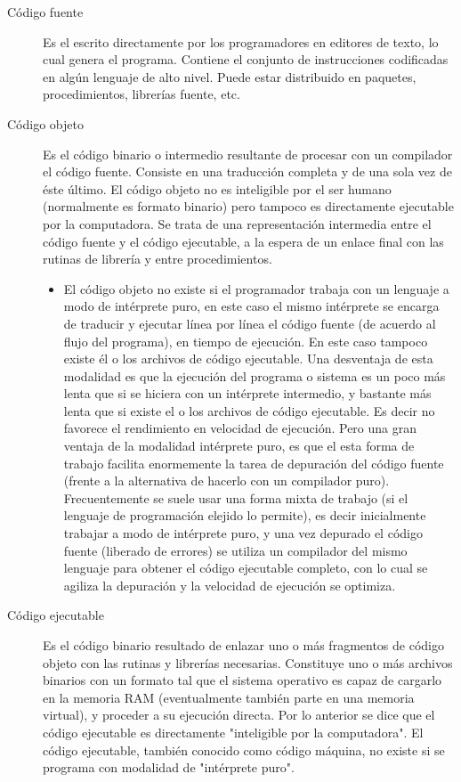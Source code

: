 \documentclass[12pt,legalpaper]{report}
\begin{document}
\begin{description}

    \item[Código fuente] Es el escrito directamente por los programadores en editores de texto, lo cual genera el programa. Contiene el conjunto de instrucciones codificadas en algún lenguaje de alto nivel. Puede estar distribuido en paquetes, procedimientos, librerías fuente, etc.

    \item[Código objeto] Es el código binario o intermedio resultante de procesar con un compilador el código fuente. Consiste en una traducción completa y de una sola vez de éste último. El código objeto no es inteligible por el ser humano (normalmente es formato binario) pero tampoco es directamente ejecutable por la computadora. Se trata de una representación intermedia entre el código fuente y el código ejecutable, a la espera de un enlace final con las rutinas de librería y entre procedimientos.

	\begin{itemize}
		\item El código objeto no existe si el programador trabaja con un lenguaje a modo de intérprete puro, en este caso el mismo intérprete se encarga de traducir y ejecutar línea por línea el código fuente (de acuerdo al flujo del programa), en tiempo de ejecución. En este caso tampoco existe él o los archivos de código ejecutable. Una desventaja de esta modalidad es que la ejecución del programa o sistema es un poco más lenta que si se hiciera con un intérprete intermedio, y bastante más lenta que si existe el o los archivos de código ejecutable. Es decir no favorece el rendimiento en velocidad de ejecución. Pero una gran ventaja de la modalidad intérprete puro, es que el esta forma de trabajo facilita enormemente la tarea de depuración del código fuente (frente a la alternativa de hacerlo con un compilador puro). Frecuentemente se suele usar una forma mixta de trabajo (si el lenguaje de programación elejido lo permite), es decir inicialmente trabajar a modo de intérprete puro, y una vez depurado el código fuente (liberado de errores) se utiliza un compilador del mismo lenguaje para obtener el código ejecutable completo, con lo cual se agiliza la depuración y la velocidad de ejecución se optimiza.
	\end{itemize}

	\item[Código ejecutable] Es el código binario resultado de enlazar uno o más fragmentos de código objeto con las rutinas y librerías necesarias. Constituye uno o más archivos binarios con un formato tal que el sistema operativo es capaz de cargarlo en la memoria RAM (eventualmente también parte en una memoria virtual), y proceder a su ejecución directa. Por lo anterior se dice que el código ejecutable es directamente "inteligible por la computadora". El código ejecutable, también conocido como código máquina, no existe si se programa con modalidad de "intérprete puro".


\end{description}
\end{document}
